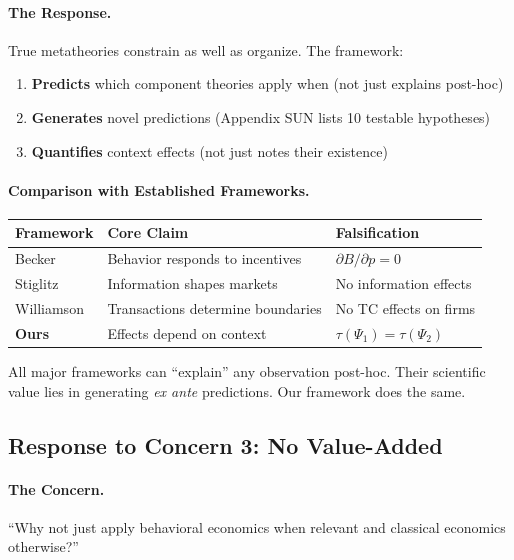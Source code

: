 \paragraph{The Response.}
True metatheories constrain as well as organize. The framework:
\begin{enumerate}
    \item \textbf{Predicts} which component theories apply when (not just explains post-hoc)
    \item \textbf{Generates} novel predictions (Appendix SUN lists 10 testable hypotheses)
    \item \textbf{Quantifies} context effects (not just notes their existence)
\end{enumerate}

\paragraph{Comparison with Established Frameworks.}

\begin{center}
\renewcommand{\arraystretch}{1.3}
\begin{tabular}{lll}
\hline
\textbf{Framework} & \textbf{Core Claim} & \textbf{Falsification} \\
\hline
Becker & Behavior responds to incentives & $\partial B/\partial p = 0$ \\
Stiglitz & Information shapes markets & No information effects \\
Williamson & Transactions determine boundaries & No TC effects on firms \\
\textbf{Ours} & Effects depend on context & $\tau(\Psi_1) = \tau(\Psi_2)$ \\
\hline
\end{tabular}
\end{center}

All major frameworks can ``explain'' any observation post-hoc. Their scientific value lies in generating \textit{ex ante} predictions. Our framework does the same.

\subsection{Response to Concern 3: No Value-Added}

\paragraph{The Concern.}
``Why not just apply behavioral economics when relevant and classical economics otherwise?''

